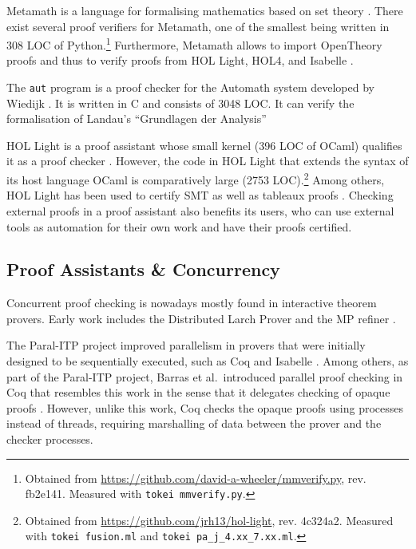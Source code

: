 \documentclass[screen,sigplan,10pt]{acmart}
\begin{document}
Metamath is a language for formalising mathematics based on set theory
\citep{megill2019}. There exist several proof verifiers for Metamath,
one of the smallest being written in 308 LOC of Python.\footnote{Obtained
  from \url{https://github.com/david-a-wheeler/mmverify.py}, rev.
  fb2e141. Measured with \texttt{tokei\ mmverify.py}.} Furthermore,
Metamath allows to import OpenTheory proofs and thus to verify proofs
from HOL Light, HOL4, and Isabelle
\citep{DBLP:journals/jfrea/Carneiro16}.

The \texttt{aut} program is a proof checker for the Automath system
developed by Wiedijk \citep{DBLP:journals/jar/Wiedijk02}. It is written
in C and consists of 3048 LOC. It can verify the formalisation of
Landau's ``Grundlagen der Analysis''

HOL Light is a proof assistant whose small kernel (396 LOC of OCaml)
qualifies it as a proof checker \citep{DBLP:conf/tphol/Harrison09a}.
However, the code in HOL Light that extends the syntax of its host
language OCaml is comparatively large (2753 LOC).\footnote{Obtained from
  \url{https://github.com/jrh13/hol-light}, rev. 4c324a2. Measured with
  \texttt{tokei\ fusion.ml} and \texttt{tokei\ pa\_j\_4.xx\_7.xx.ml}.}
Among others, HOL Light has been used to certify SMT
\citep{DBLP:journals/fmsd/StumpORHT13} as well as tableaux proofs
\citep{DBLP:conf/cpp/KaliszykUV15, DBLP:conf/tableaux/0002K19}. Checking
external proofs in a proof assistant also benefits its users, who can
use external tools as automation for their own work and have their
proofs certified.

\hypertarget{proof-assistants-concurrency}{%
\subsection{Proof Assistants \&
Concurrency}\label{proof-assistants-concurrency}}

Concurrent proof checking is nowadays mostly found in interactive
theorem provers. Early work includes the Distributed Larch Prover
\citep{DBLP:conf/rta/VandevoordeK96} and the MP refiner
\citep{DBLP:conf/tphol/Moten98}.

The Paral-ITP project improved parallelism in provers that were
initially designed to be sequentially executed, such as Coq and Isabelle
\citep{DBLP:conf/mkm/BarrasGHRTWW13}. Among others, as part of the
Paral-ITP project, Barras et al.~introduced parallel proof checking in
Coq that resembles this work in the sense that it delegates checking of
opaque proofs \citep{DBLP:conf/itp/BarrasTT15}. However, unlike this
work, Coq checks the opaque proofs using processes instead of threads,
requiring marshalling of data between the prover and the checker
processes.
\end{document}
